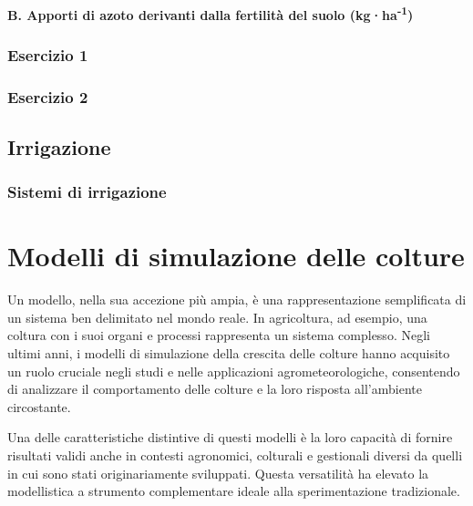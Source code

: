 \documentclass[
]{book}
\theoremstyle{definition}
\theoremstyle{definition}
\theoremstyle{definition}
\theoremstyle{definition}
\theoremstyle{remark}
\begin{document}
\hypertarget{b.-apporti-di-azoto-derivanti-dalla-fertilituxe0-del-suolo-kgha-1}{%
\subsubsection{\texorpdfstring{B. Apporti di azoto derivanti dalla fertilità del suolo (kg·ha\textsuperscript{-1})}{B. Apporti di azoto derivanti dalla fertilità del suolo (kg·ha-1)}}\label{b.-apporti-di-azoto-derivanti-dalla-fertilituxe0-del-suolo-kgha-1}}

\hypertarget{esercizio-1}{%
\subsection{Esercizio 1}\label{esercizio-1}}

\hypertarget{esercizio-2}{%
\subsection{Esercizio 2}\label{esercizio-2}}

\hypertarget{irrigazione}{%
\section{Irrigazione}\label{irrigazione}}

\hypertarget{sistemi-di-irrigazione}{%
\subsection{Sistemi di irrigazione}\label{sistemi-di-irrigazione}}

\hypertarget{modelli-di-simulazione-delle-colture}{%
\chapter{Modelli di simulazione delle colture}\label{modelli-di-simulazione-delle-colture}}

Un modello, nella sua accezione più ampia, è una rappresentazione semplificata di un sistema ben delimitato nel mondo reale. In agricoltura, ad esempio, una coltura con i suoi organi e processi rappresenta un sistema complesso. Negli ultimi anni, i modelli di simulazione della crescita delle colture hanno acquisito un ruolo cruciale negli studi e nelle applicazioni agrometeorologiche, consentendo di analizzare il comportamento delle colture e la loro risposta all'ambiente circostante.

Una delle caratteristiche distintive di questi modelli è la loro capacità di fornire risultati validi anche in contesti agronomici, colturali e gestionali diversi da quelli in cui sono stati originariamente sviluppati. Questa versatilità ha elevato la modellistica a strumento complementare ideale alla sperimentazione tradizionale.
\end{document}
